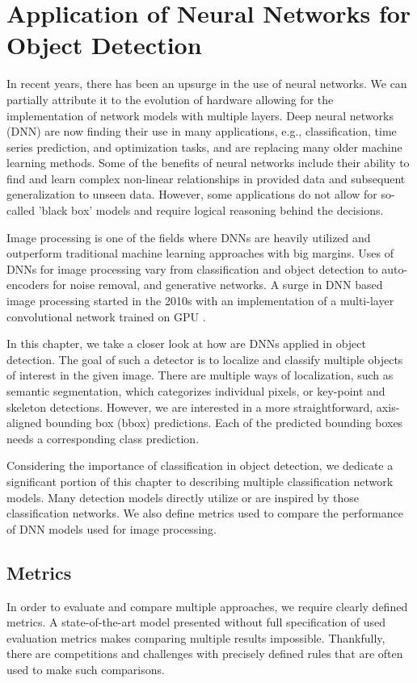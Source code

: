 \chapter{Application of Neural Networks for Object Detection}
\label{chap:nns}
In recent years, there has been an upsurge in the use of neural networks. We can partially attribute it to the evolution of hardware allowing for the implementation of network models with multiple layers. Deep neural networks (DNN) are now finding their use in many applications, e.g., classification, time series prediction, and optimization tasks, and are replacing many older machine learning methods. Some of the benefits of neural networks include their ability to find and learn complex non-linear relationships in provided data and subsequent generalization to unseen data. However, some applications do not allow for so-called 'black box' models and require logical reasoning behind the decisions.

Image processing is one of the fields where DNNs are heavily utilized and outperform traditional machine learning approaches with big margins. Uses of DNNs for image processing vary from classification and object detection to auto-encoders for noise removal, and generative networks. A surge in DNN based image processing started in the 2010s with an implementation of a multi-layer convolutional network trained on GPU \cite{bib:deepOnGpu}. 

In this chapter, we take a closer look at how are DNNs applied in object detection. The goal of such a detector is to localize and classify multiple objects of interest in the given image. There are multiple ways of localization, such as semantic segmentation, which categorizes individual pixels, or key-point and skeleton detections. However, we are interested in a more straightforward, axis-aligned bounding box (bbox) predictions. Each of the predicted bounding boxes needs a corresponding class prediction.

Considering the importance of classification in object detection, we dedicate a significant portion of this chapter to describing multiple classification network models. Many detection models directly utilize or are inspired by those classification networks. We also define metrics used to compare the performance of DNN models used for image processing.

\section{Metrics}
In order to evaluate and compare multiple approaches, we require clearly defined metrics. A state-of-the-art model presented without full specification of used evaluation metrics makes comparing multiple results impossible. Thankfully, there are competitions and challenges with precisely defined rules that are often used to make such comparisons. 

